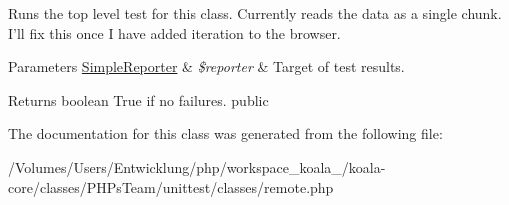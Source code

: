 \label{class_remote_test_case_ad6d2c5e3b7a342afc77f3a103cc25582}
Runs the top level test for this class. Currently reads the data as a single chunk. I'll fix this once I have added iteration to the browser. 
\begin{DoxyParams}[1]{Parameters}
\hyperlink{class_simple_reporter}{SimpleReporter} & {\em \$reporter} & Target of test results. \\
\hline
\end{DoxyParams}
\begin{DoxyReturn}{Returns}
boolean True if no failures.  public 
\end{DoxyReturn}


The documentation for this class was generated from the following file:\begin{DoxyCompactItemize}
\item 
/Volumes/Users/Entwicklung/php/workspace\_\-koala\_/koala-\/core/classes/PHPsTeam/unittest/classes/remote.php\end{DoxyCompactItemize}
